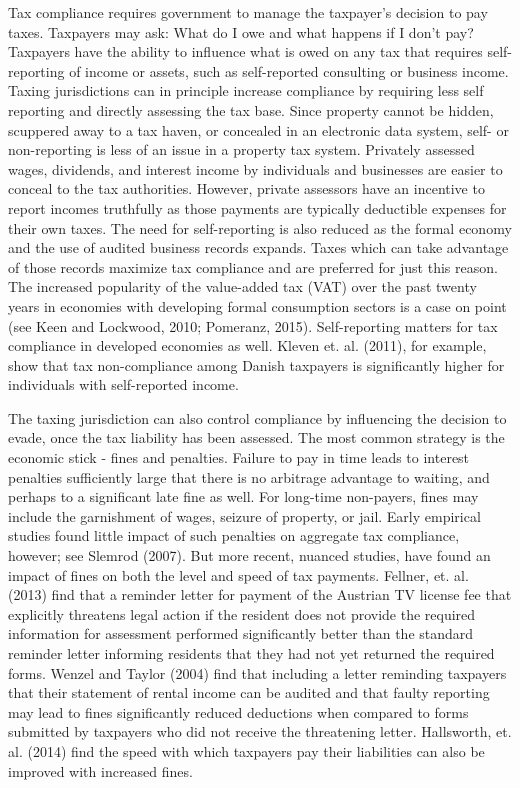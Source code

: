 \documentclass[12pt,titlepage]{article}
\begin{document}
Tax compliance requires government to manage the taxpayer's decision
to pay taxes.  Taxpayers may ask: What do I owe and what happens if I
don't pay?  Taxpayers have the ability to influence what is owed on
any tax that requires self-reporting of income or assets, such as
self-reported consulting or business income.  Taxing jurisdictions can
in principle increase compliance by requiring less self reporting and
directly assessing the tax base.  Since property cannot be hidden,
scuppered away to a tax haven, or concealed in an electronic data
system, self- or non-reporting is less of an issue in a property tax
system.  Privately assessed wages, dividends, and interest income by
individuals and businesses are easier to conceal to the tax
authorities.  However, private assessors have an incentive to report
incomes truthfully as those payments are typically deductible expenses
for their own taxes.  The need for self-reporting is also reduced as
the formal economy and the use of audited business records expands.
Taxes which can take advantage of those records maximize tax
compliance and are preferred for just this reason.  The increased
popularity of the value-added tax (VAT) over the past twenty years in
economies with developing formal consumption sectors is a case on
point (see Keen and Lockwood, 2010; Pomeranz, 2015).  Self-reporting
matters for tax compliance in developed economies as well.  Kleven
et. al. (2011), for example, show that tax non-compliance among Danish
taxpayers is significantly higher for individuals with self-reported
income.

The taxing jurisdiction can also control compliance by influencing the
decision to evade, once the tax liability has been assessed.  The most
common strategy is the economic stick - fines and penalties.  Failure
to pay in time leads to interest penalties sufficiently large that
there is no arbitrage advantage to waiting, and perhaps to a
significant late fine as well.  For long-time non-payers, fines may
include the garnishment of wages, seizure of property, or jail.  Early
empirical studies found little impact of such penalties on aggregate
tax compliance, however; see Slemrod (2007).  But more recent, nuanced
studies, have found an impact of fines on both the level and speed of
tax payments.  Fellner, et. al. (2013) find that a reminder letter for
payment of the Austrian TV license fee that explicitly threatens legal
action if the resident does not provide the required information for
assessment performed significantly better than the standard reminder
letter informing residents that they had not yet returned the required
forms.  Wenzel and Taylor (2004) find that including a letter
reminding taxpayers that their statement of rental income can be
audited and that faulty reporting may lead to fines significantly
reduced deductions when compared to forms submitted by taxpayers who
did not receive the threatening letter.  Hallsworth, et. al. (2014)
find the speed with which taxpayers pay their liabilities can also be
improved with increased fines.
\end{document}
